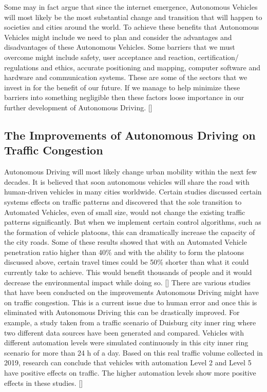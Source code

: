 \documentclass{article}
\begin{document}
Some may in fact argue that since the internet emergence, Autonomous Vehicles will most likely be the most substantial change and transition that will happen to societies and cities around the world. To achieve these benefits that Autonomous Vehicles might include we need to plan and consider the advantages and disadvantages of these Autonomous Vehicles. Some barriers that we must overcome might include safety, user acceptance and reaction, certification/ regulations and ethics, accurate positioning and mapping, computer software and hardware and communication systems. These are some of the sectors that we invest in for the benefit of our future. If we manage to help minimize these barriers into something negligible then these factors loose importance in our further development of Autonomous Driving. [\textcite{bezai2021future}] 

\subsection{The Improvements of Autonomous Driving on Traffic Congestion}

Autonomous Driving will most likely change urban mobility within the next few decades. It is believed that soon autonomous vehicles will share the road with human-driven vehicles in many cities worldwide. Certain studies discussed certain systems effects on traffic patterns and discovered that the sole transition to Automated Vehicles, even of small size, would not change the existing traffic patterns significantly. But when we implement certain control algorithms, such as the formation of vehicle platoons, this can dramatically increase the capacity of the city roads. Some of these results showed that with an Automated Vehicle penetration ratio higher than 40\% and with the ability to form the platoons discussed above, certain travel times could be 50\% shorter than what it could currently take to achieve. This would benefit thousands of people and it would decrease the environmental impact while doing so. [\textcite{santana2021transitioning}]
\bigbreak
There are various studies that have been conducted on the improvements Autonomous Driving might have on traffic congestion. This is a current issue due to human error and once this is eliminated with Autonomous Driving this can be drastically improved. For example, a study taken from a traffic scenario of Duisburg city inner ring where two different data sources have been generated and compared. Vehicles with different automation levels were simulated continuously in this city inner ring scenario for more than 24 h of a day. Based on this real traffic volume collected in 2019, research can conclude that vehicles with automation Level 2 and Level 5 have positive effects on traffic. The higher automation levels show more positive effects in these studies.  [\textcite{ma2021traffic}]
\end{document}
